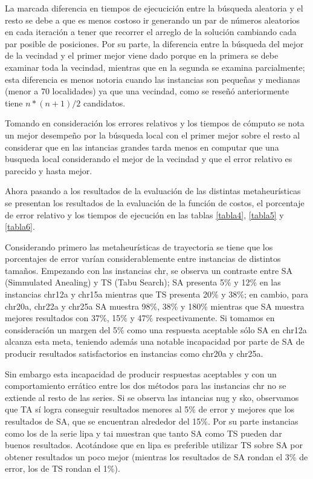 \documentclass{ci5652}
\begin{document}
La marcada diferencia en tiempos de ejecucición entre la búsqueda aleatoria y el resto se debe a que es menos costoso ir generando un par de números aleatorios en cada iteración a tener que recorrer el arreglo de la solución cambiando cada par posible de posiciones. Por su parte, la diferencia entre la búsqueda del mejor de la vecindad y el primer mejor viene dado porque en la primera se debe examinar toda la vecindad, mientras que en la segunda se examina parcialmente; esta diferencia es menos notoria cuando las instancias son pequeñas y medianas (menor a 70 localidades) ya que una vecindad, como se reseñó anteriormente tiene $n*(n+1)/2$ candidatos.

Tomando en consideración los errores relativos y los tiempos de cómputo se nota un mejor desempeño por la búsqueda local con el primer mejor sobre el resto al considerar que en las intancias grandes tarda menos en computar que una busqueda local considerando el mejor de la vecindad y que el error relativo es parecido y hasta mejor.

Ahora pasando a los resultados de la evaluación de las distintas metaheurísticas se presentan los resultados de la evaluación de la función de costos, el porcentaje de error relativo y los tiempos de ejecución en las tablas \ref{tabla4}, \ref{tabla5} y \ref{tabla6}.

Considerando primero las metaheurísticas de trayectoria se tiene que los porcentajes de error varían considerablemente entre instancias de distintos tamaños. Empezando con las instancias chr, se observa un contraste entre SA (Simmulated Anealing) y TS (Tabu Search); SA presenta 5\% y 12\% en las instancias chr12a y chr15a mientras que TS presenta 20\% y 38\%; en cambio, para chr20a, chr22a y chr25a SA muestra 98\%, 38\% y 180\%  mientras que SA muestra mejores resultados con 37\%, 15\% y 47\% respectivamente.
Si tomamos en consideración un margen del 5\% como una respuesta aceptable sólo SA en chr12a alcanza esta meta, teniendo además una notable incapacidad por parte de SA de producir resultados satisfactorios en instancias como chr20a y chr25a.

Sin embargo esta incapacidad de producir respuestas aceptables y con un comportamiento errático entre los dos métodos para las instancias chr no se extiende al resto de las series. Si se observa las intancias nug y sko, observamos que TA sí logra conseguir resultados menores al 5\% de error y mejores que los resultados de SA, que se encuentran alrededor del 15\%. Por su parte instancias como los de la serie lipa y tai muestran que tanto SA como TS pueden dar buenos resultados. Acotándose que en lipa es preferible utilizar TS sobre SA por obtener resultados un poco mejor (mientras los resultados de SA rondan el 3\% de error, los de TS rondan el 1\%).
\end{document}
